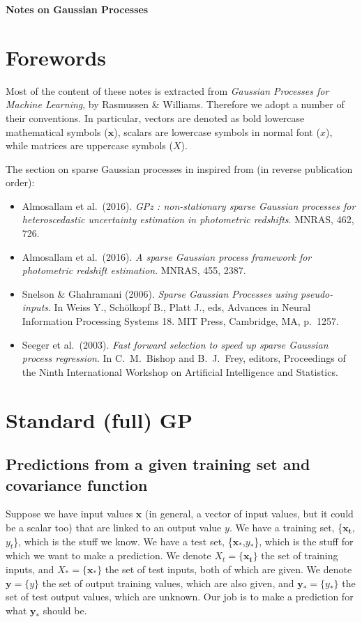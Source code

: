 \documentclass[11pt,a4paper]{article}
\numberwithin{equation}{section}
\begin{document}
{\huge \bfseries Notes on Gaussian Processes\\[1.5cm]}

\section{Forewords}

Most of the content of these notes is extracted from {\it Gaussian Processes for Machine Learning}, by Rasmussen \& Williams. Therefore we adopt a number of their conventions. In particular, vectors are denoted as bold lowercase mathematical symbols ($\mathbf{x}$), scalars are lowercase symbols in normal font ($x$), while matrices are uppercase symbols ($X$).

The section on sparse Gaussian processes in inspired from (in reverse publication order):
\begin{itemize}
  \item Almosallam et al.~(2016). {\it GPz : non-stationary sparse Gaussian processes for heteroscedastic uncertainty estimation in photometric redshifts}. MNRAS, 462, 726.
  \item Almosallam et al.~(2016). {\it A sparse Gaussian process framework for photometric redshift estimation}. MNRAS, 455, 2387.
  \item Snelson \& Ghahramani (2006). {\it Sparse Gaussian Processes using pseudo-inputs}. In Weiss Y., Sch\"olkopf B., Platt J., eds, Advances in Neural Information Processing Systems 18. MIT Press, Cambridge, MA, p.~1257.
  \item Seeger et al.~(2003). {\it Fast forward selection to speed up sparse Gaussian process regression}. In C.~M.~Bishop and B.~J.~Frey, editors, Proceedings of the Ninth International Workshop on Artificial Intelligence and Statistics.
\end{itemize}

\section{Standard (full) GP}

\subsection{Predictions from a given training set and covariance function}

Suppose we have input values $\mathbf{x}$ (in general, a vector of input values, but it could be a scalar too) that are linked to an output value $y$. We have a training set, \{$\mathbf{x_t}$,$y_t$\}, which is the stuff we know. We have a test set, \{$\mathbf{x_*}$,$y_*$\}, which is the stuff for which we want to make a prediction. We denote $X_t = \{\mathbf{x_t}\}$ the set of training inputs, and $X_* = \{\mathbf{x_*}\}$ the set of test inputs, both of which are given. We denote $\mathbf{y} = \{y\}$ the set of output training values, which are also given, and $\mathbf{y_*} = \{y_*\}$ the set of test output values, which are unknown. Our job is to make a prediction for what $\mathbf{y_*}$ should be.
\end{document}
